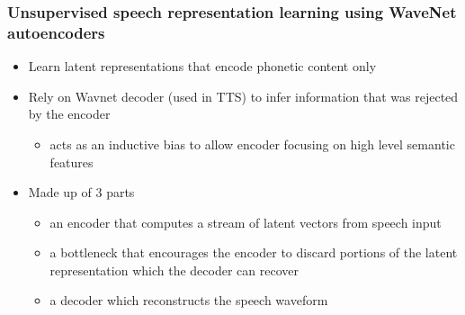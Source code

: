 \documentclass[table]{beamer}
\begin{document}
\begin{frame}
\frametitle{Unsupervised speech representation learning using WaveNet autoencoders \citep{DBLP:journals/corr/abs-1901-08810}}

		\begin{itemize}
			\item Learn latent representations that encode phonetic content only
			\item Rely on Wavnet decoder (used in TTS) to infer information that was rejected by the encoder
				\begin{itemize}
				\item acts as an inductive bias to allow encoder focusing on high level semantic features
				\end{itemize}
			\item Made up of 3 parts
				\begin{itemize}
				\item an encoder that computes a stream of latent vectors from speech input
				\item a bottleneck that encourages the encoder to discard portions of the latent representation which the decoder can recover
				\item a decoder which reconstructs the speech waveform 
				\end{itemize}			
		\end{itemize} 

\end{frame}
\end{document}
